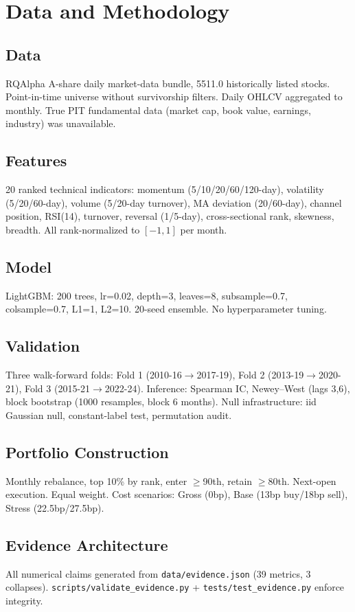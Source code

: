 \section{Data and Methodology}
\subsection{Data}
RQAlpha A-share daily market-data bundle, 5511.0 historically listed stocks. Point-in-time universe without survivorship filters. Daily OHLCV aggregated to monthly. True PIT fundamental data (market cap, book value, earnings, industry) was unavailable.

\subsection{Features}
20 ranked technical indicators: momentum (5/10/20/60/120-day), volatility (5/20/60-day), volume (5/20-day turnover), MA deviation (20/60-day), channel position, RSI(14), turnover, reversal (1/5-day), cross-sectional rank, skewness, breadth. All rank-normalized to $[-1,1]$ per month.

\subsection{Model}
LightGBM: 200 trees, lr=0.02, depth=3, leaves=8, subsample=0.7, colsample=0.7, L1=1, L2=10. 20-seed ensemble. No hyperparameter tuning.

\subsection{Validation}
Three walk-forward folds: Fold 1 (2010-16$\to$2017-19), Fold 2 (2013-19$\to$2020-21), Fold 3 (2015-21$\to$2022-24).
Inference: Spearman IC, Newey--West (lags 3,6), block bootstrap (1000 resamples, block 6 months).
Null infrastructure: iid Gaussian null, constant-label test, permutation audit.

\subsection{Portfolio Construction}
Monthly rebalance, top 10\% by rank, enter $\ge$90th, retain $\ge$80th. Next-open execution. Equal weight.
Cost scenarios: Gross (0bp), Base (13bp buy/18bp sell), Stress (22.5bp/27.5bp).

\subsection{Evidence Architecture}
All numerical claims generated from \texttt{data/evidence.json} (39 metrics, 3 collapses). \texttt{scripts/validate\_evidence.py} + \texttt{tests/test\_evidence.py} enforce integrity.
